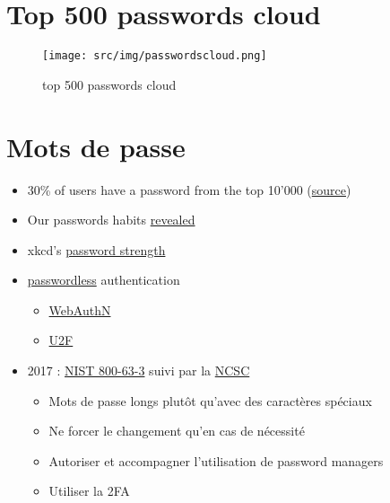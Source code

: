 \hypertarget{top-500-passwords-cloud}{%
\section{Top 500 passwords cloud}\label{top-500-passwords-cloud}}

\begin{figure}
\centering
\texttt{[image: src/img/passwordscloud.png]}
\caption{top 500 passwords cloud}
\end{figure}

\hypertarget{mots-de-passe}{%
\section{Mots de passe}\label{mots-de-passe}}

\begin{itemize}
\tightlist
\item
  30\% of users have a password from the top 10'000
  (\href{https://xato.net/10-000-top-passwords-6d6380716fe0\#.q5gcg2vme}{source})
\item
  Our passwords habits
  \href{http://visual.ly/our-password-habits-revealed}{revealed}
\item
  xkcd's \href{http://xkcd.com/936/}{password strength}
\item
  \href{https://hacks.mozilla.org/2014/10/passwordless-authentication-secure-simple-and-fast-to-deploy/}{passwordless}
  authentication

  \begin{itemize}
  \tightlist
  \item
    \href{https://en.wikipedia.org/wiki/WebAuthn}{WebAuthN}
  \item
    \href{https://u2f-key.tech/fr/}{U2F}
  \end{itemize}
\item
  2017 :
  \href{https://nakedsecurity.sophos.com/2016/08/18/nists-new-password-rules-what-you-need-to-know/}{NIST
  800-63-3} suivi par la
  \href{https://www.ncsc.gov.uk/guidance/password-guidance-simplifying-your-approach}{NCSC}

  \begin{itemize}
  \tightlist
  \item
    Mots de passe longs plutôt qu'avec des caractères spéciaux
  \item
    Ne forcer le changement qu'en cas de nécessité
  \item
    Autoriser et accompagner l'utilisation de password managers
  \item
    Utiliser la 2FA
  \end{itemize}
\end{itemize}

